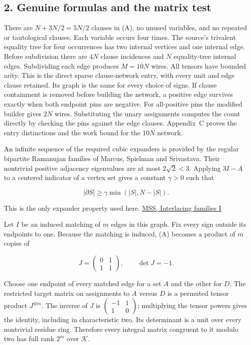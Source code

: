 \documentclass[
  11pt,
]{article}
\begin{document}
\subsection{2. Genuine formulas and the matrix
test}\label{genuine-formulas-and-the-matrix-test}

There are \(N+3N/2=5N/2\) clauses in (A), no unused variables, and no
repeated or tautological clauses. Each variable occurs four times. The
source's trivalent equality tree for four occurrences has two internal
vertices and one internal edge. Before subdivision there are \(4N\)
clause incidences and \(N\) equality-tree internal edges. Subdividing
each edge produces \(M=10N\) wires. All tensors have bounded arity.
This is the direct sparse clause-network entry, with every unit and
edge clause retained. Its graph is the same for every choice of signs.
If clause containment is removed before building the network, a
positive edge survives exactly when both endpoint pins are negative.
For all-positive pins the modified builder gives \(2N\) wires.
Substituting the unary assignments computes the count directly by
checking the pins against the edge clauses. Appendix~C proves the
entry distinctions and the work bound for the \(10N\) network.

An infinite sequence of the required cubic expanders is provided by the
regular bipartite Ramanujan families of Marcus, Spielman and Srivastava.
Their nontrivial positive adjacency eigenvalues are at most
\(2\sqrt2<3\). Applying \(3I-A\) to a centered indicator of a vertex set
gives a constant \(\gamma>0\) such that

\[
|\partial S|\ge\gamma\min(|S|,N-|S|).
\]

This is the only expander property used here.
\href{https://annals.math.princeton.edu/2015/182-1/p07}{MSS, Interlacing
families I}

Let \(I\) be an induced matching of \(m\) edges in this graph. Fix every
sign outside its endpoints to one. Because the matching is induced, (A)
becomes a product of \(m\) copies of

\[
J=\begin{pmatrix}0&1\\1&1\end{pmatrix},\qquad\det J=-1.
\]

Choose one endpoint of every matched edge for a set \(A\) and the other
for \(D\). The restricted target matrix on assignments to \(A\) versus
\(D\) is a permuted tensor product \(J^{\otimes m}\). The inverse of \(J\) is
\(\left(\begin{smallmatrix}-1&1\\1&0\end{smallmatrix}\right)\); multiplying the
tensor powers gives the identity, including in characteristic two.
Its determinant is a unit over every nontrivial residue ring. Therefore every
integral matrix congruent to it modulo two has full rank \(2^m\) over
\(\mathcal K\).
\end{document}
